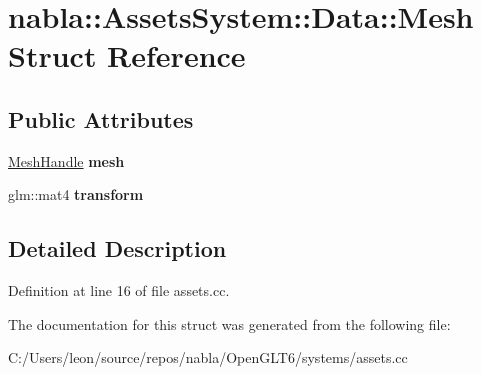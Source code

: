 \hypertarget{structnabla_1_1_assets_system_1_1_data_1_1_mesh}{}\section{nabla\+::Assets\+System\+::Data\+::Mesh Struct Reference}
\label{structnabla_1_1_assets_system_1_1_data_1_1_mesh}
\subsection*{Public Attributes}
\begin{DoxyCompactItemize}
\item 
\mbox{\label{structnabla_1_1_assets_system_1_1_data_1_1_mesh_ab8461666aa4e11e1d129ff6b2efe470a}} 
\mbox{\hyperlink{classnabla_1_1renderer_1_1_handle}{Mesh\+Handle}} {\bfseries mesh}
\item 
\mbox{\label{structnabla_1_1_assets_system_1_1_data_1_1_mesh_a8bef25e0f25945a4cd5f10e08111a6b8}} 
glm\+::mat4 {\bfseries transform}
\end{DoxyCompactItemize}


\subsection{Detailed Description}


Definition at line 16 of file assets.\+cc.



The documentation for this struct was generated from the following file\+:\begin{DoxyCompactItemize}
\item 
C\+:/\+Users/leon/source/repos/nabla/\+Open\+G\+L\+T6/systems/assets.\+cc\end{DoxyCompactItemize}
